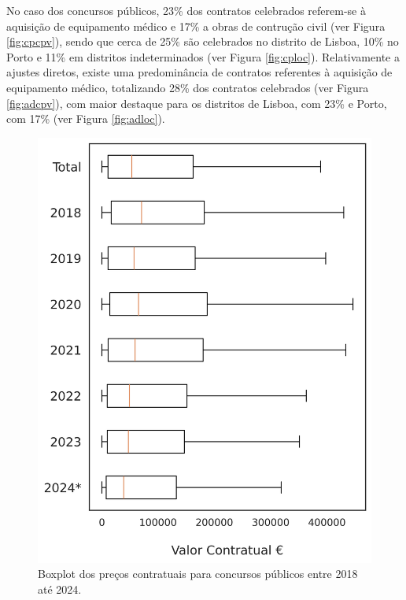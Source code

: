 No caso dos concursos públicos, 23\% dos contratos celebrados referem-se à aquisição de equipamento médico e 17\% a obras de contrução civil (ver Figura \ref{fig:cpcpv}), sendo que cerca de 25\% são celebrados no distrito de Lisboa, 10\% no Porto e 11\% em distritos indeterminados (ver Figura \ref{fig:cploc}). Relativamente a ajustes diretos, existe uma predominância de contratos referentes à aquisição de equipamento médico, totalizando 28\% dos contratos celebrados (ver Figura \ref{fig:adcpv}), com maior destaque para os distritos de Lisboa, com 23\% e Porto, com 17\%  (ver Figura \ref{fig:adloc}).

\vfill

\begin{figure}[H]
	\centering
	\begin{minipage}{0.31\linewidth}
		\includegraphics[width=\textwidth]{imagens/concpub_stat.png}
		\caption{Boxplot dos preços contratuais para concursos públicos entre 2018 até 2024.}
		\label{fig:precocps}
	\end{minipage}

\end{figure}
